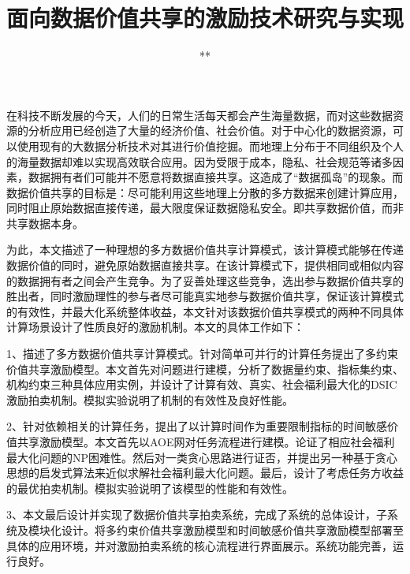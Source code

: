 \documentclass[promaster]{thesis-uestc}
\title{面向数据价值共享的激励技术研究与实现}{The Study and Implementation of Incentive Techniques for Value-based Data Sharing}
\author{**}{**}
\begin{document}
\makecover

\originalitydeclaration

\begin{chineseabstract}

在科技不断发展的今天，人们的日常生活每天都会产生海量数据，而对这些数据资源的分析应用已经创造了大量的经济价值、社会价值。对于中心化的数据资源，可以使用现有的大数据分析技术对其进行价值挖掘。而地理上分布于不同组织及个人的海量数据却难以实现高效联合应用。因为受限于成本，隐私、社会规范等诸多因素，数据拥有者们可能并不愿意将数据直接共享。这造成了“数据孤岛”的现象。而数据价值共享的目标是：尽可能利用这些地理上分散的多方数据来创建计算应用，同时阻止原始数据直接传递，最大限度保证数据隐私安全。即共享数据价值，而非共享数据本身。

为此，本文描述了一种理想的多方数据价值共享计算模式，该计算模式能够在传递数据价值的同时，避免原始数据直接共享。在该计算模式下，提供相同或相似内容的数据拥有者之间会产生竞争。为了妥善处理这些竞争，选出参与数据价值共享的胜出者，同时激励理性的参与者尽可能真实地参与数据价值共享，保证该计算模式的有效性，并最大化系统整体收益，本文针对该数据价值共享模式的两种不同具体计算场景设计了性质良好的激励机制。本文的具体工作如下：

1、描述了多方数据价值共享计算模式。针对简单可并行的计算任务提出了多约束价值共享激励模型。本文首先对问题进行建模，分析了数据量约束、指标集约束、机构约束三种具体应用实例，并设计了计算有效、真实、社会福利最大化的DSIC激励拍卖机制。模拟实验说明了机制的有效性及良好性能。

2、针对依赖相关的计算任务，提出了以计算时间作为重要限制指标的时间敏感价值共享激励模型。本文首先以AOE网对任务流程进行建模。论证了相应社会福利最大化问题的NP困难性。然后对一类贪心思路进行证否，并提出另一种基于贪心思想的启发式算法来近似求解社会福利最大化问题。最后，设计了考虑任务方收益的最优拍卖机制。模拟实验说明了该模型的性能和有效性。

3、本文最后设计并实现了数据价值共享拍卖系统，完成了系统的总体设计，子系统及模块化设计。将多约束价值共享激励模型和时间敏感价值共享激励模型部署至具体的应用环境，并对激励拍卖系统的核心流程进行界面展示。系统功能完善，运行良好。


\end{chineseabstract}
\end{document}
